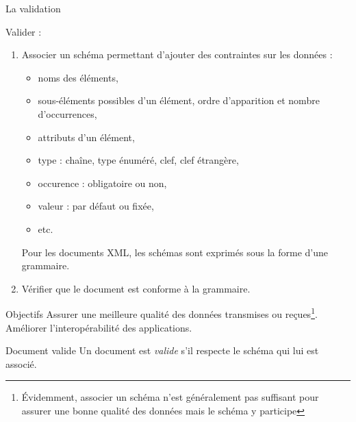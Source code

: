\begin{frame}[allowframebreaks]{La validation}

Valider :
\begin{enumerate}
\item Associer un sch\'ema permettant d'ajouter des contraintes sur les donn\'ees : 
\begin{itemize}
\item noms des \'el\'ements, 
\item sous-\'el\'ements possibles d'un \'el\'ement, ordre d'apparition et nombre d’occurrences,
\item attributs d'un \'el\'ement,
\item type : cha\^ine, type \'enum\'er\'e, clef, clef \'etrangère,
\item occurence : obligatoire ou non,
\item valeur : par d\'efaut ou fix\'ee,
\item etc.
\end{itemize}
Pour les documents XML, les schémas sont exprim\'es sous la forme d'une grammaire.
\item V\'erifier que le document est conforme \`a la grammaire.
\end{enumerate}

\begin{block}{Objectifs}
Assurer une meilleure qualit\'e des donn\'ees transmises ou re\c{c}ues\footnote{\'Evidemment, associer un schéma n'est g\'en\'eralement pas suffisant pour assurer une bonne qualit\'e des donn\'ees mais le schéma y participe}.\\
Am\'eliorer l'interop\'erabilit\'e des applications.
\end{block}


\framebreak

\begin{block}{Document valide}
Un document est \emph{valide} s'il respecte le schéma qui lui est associé.
\end{block}

\end{frame}


